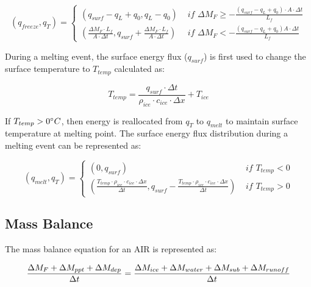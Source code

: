 \documentclass[utf8]{frontiersSCNS} %
\begin{document}
\begin{equation}
	(q_{freeze}, q_{T}) = \left\{ \begin{array}{ll}
		(q_{surf}-q_{L}+q_{0}, q_{L}-q_{0}) & \textit{ if } \Delta M_{F} \geq -\frac{(q_{surf}-q_{L}+q_{0}) \cdot A \cdot \Delta
		t}{L_f}                                                                                                                  \\
		(\frac{\Delta M_{F} \cdot L_f
		}{A \cdot \Delta t}
		, q_{surf}+\frac{\Delta M_{F} \cdot L_f
		}{A \cdot \Delta t})                & \textit{ if } \Delta M_{F} < -\frac{(q_{surf}-q_{L}+q_0) A \cdot \Delta
		t}{L_f}
	\end{array} \right.
\end{equation}

During a melting event, the surface energy flux ($q_{surf}$) is first used to change the surface temperature to
$T_{temp}$ calculated as:

\begin{equation} T_{temp} =\frac{q_{surf} \cdot \Delta t}{\rho_{ice} \cdot c_{ice} \cdot \Delta x} + T_{ice} \end{equation}

If $T_{temp} > 0 \degree C$, then energy is reallocated from $q_{T}$ to $q_{melt}$ to maintain surface temperature at
melting point. The surface energy flux distribution during a melting event can be represented as:

\begin{equation}
	(q_{melt}, q_{T}) = \left\{ \begin{array}{ll}
		(0, q_{surf})                                                                                                                                                 & \textit{ if } T_{temp} < 0 \\
		(\frac{T_{temp} \cdot \rho_{ice} \cdot c_{ice} \cdot \Delta x}{\Delta t}, q_{surf}-\frac{T_{temp} \cdot \rho_{ice} \cdot c_{ice} \cdot \Delta x}{\Delta t}  ) & \textit{ if } T_{temp} > 0
	\end{array} \right.
\end{equation}


\subsection{Mass Balance}
The mass balance equation for an AIR is represented as:

\begin{equation}
	\frac{\Delta M_{F} + \Delta M_{ppt} + \Delta M_{dep}}{\Delta t} = \frac{\Delta M_{ice} +\Delta M_{water} +
		\Delta M_{sub} + \Delta M_{runoff}}{\Delta t}  \\
	\label{eq:MB}
\end{equation}
\end{document}
